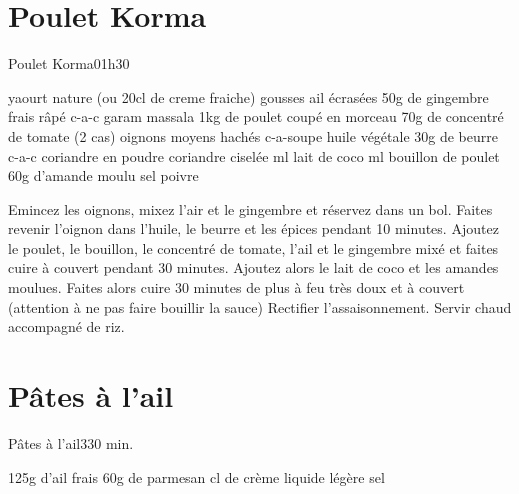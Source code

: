 {%
\section{Poulet Korma}
\begin{recette}{Poulet Korma}{0}{1h30}{}
\begin{ingredients}
 yaourt nature (ou 20cl de creme fraiche) %
 gousses ail écrasées
\ingredient 50g de gingembre frais râpé %
 c-a-c garam massala %
\ingredient 1kg de poulet coupé en morceau
\ingredient 70g de concentré de tomate (2 cas)
 oignons moyens hachés
 c-a-soupe huile végétale
\ingredient 30g de beurre
 c-a-c coriandre en poudre
\ingredient coriandre ciselée
 ml lait de coco
 ml bouillon de poulet
\ingredient 60g d'amande moulu
\ingredient sel
\ingredient poivre
\end{ingredients}

\begin{preparation}
\etape Emincez les oignons, mixez l'air et le gingembre et réservez dans un bol.
\etape Faites revenir l'oignon dans l'huile, le beurre et les épices pendant 10 minutes. 
\etape Ajoutez le poulet, le bouillon, le concentré de tomate, l'ail et le gingembre mixé et faites cuire à couvert pendant 30 minutes.
\etape Ajoutez alors le lait de coco et les amandes moulues. Faites alors cuire 30 minutes de plus à feu très doux et à couvert (attention à ne pas faire bouillir la sauce) Rectifier l'assaisonnement.
\etape Servir chaud accompagné de riz.
\end{preparation}
\end{recette}

\section{Pâtes à l'ail}
\begin{recette}{Pâtes à l'ail}{3}{30 min.}{}
\begin{ingredients}
\ingredient 125g d'ail frais
\ingredient 60g de parmesan
 cl de crème liquide légère 
\ingredient sel
\end{ingredients}



\end{recette}}
